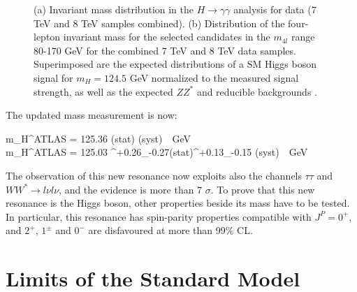 \begin{figure}[h]
\centering
\caption[Invariant mass of the candidate Higgs boson in the $\gamma \gamma $ and 4-lepton channels]{(a) Invariant mass distribution in the $H \rightarrow \gamma \gamma $ analysis for data (7 TeV and 8 TeV samples combined). (b) Distribution of the four-lepton invariant mass for the selected candidates in the $m_{4l}$ range 80-170 GeV for the combined 7 TeV and 8 TeV data samples. Superimposed are the expected distributions of a SM Higgs boson signal for $m_H=124.5$ GeV normalized to the measured signal strength, as well as the expected $ZZ^*$ and reducible backgrounds \cite{atlas:hmass}. }
\label{fig:hmass}
\end{figure}


The updated mass measurement is now:

\beq
\nonumber
m_H^{ATLAS} = 125.36 (stat) (syst) \,\, GeV \\ \nonumber
m_H^{ATLAS} = 125.03 ^{+0.26}_{-0.27}(stat)^{+0.13}_{-0.15}  (syst) \,\, GeV 
\eeq

The observation of this new resonance now exploits also the channels $\tau \tau$ and $WW^* \rightarrow l \nu l \nu$, and the evidence is more than 7 $\sigma$. To prove that this new resonance is the Higgs boson, other properties beside its mass have to be tested. In particular, this resonance has spin-parity properties compatible with $J^P=0^+$, and $2^+$, $1^\pm$ and $0^-$ are disfavoured at more than 99\% CL.



\section{Limits of the Standard Model}
\label{SMlimits}

